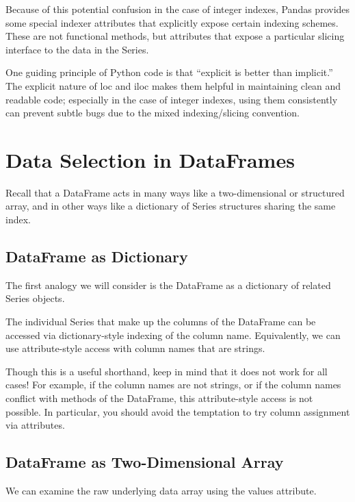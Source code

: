 Because of this potential confusion in the case of integer indexes, Pandas provides
some special indexer attributes that explicitly expose certain indexing schemes. These
are not functional methods, but attributes that expose a particular slicing interface to
the data in the Series.



One guiding principle of Python code is that “explicit is better than implicit.” The
explicit nature of loc and iloc makes them helpful in maintaining clean and readable
code; especially in the case of integer indexes, using them consistently can prevent
subtle bugs due to the mixed indexing/slicing convention.

\section{Data Selection in DataFrames}
Recall that a DataFrame acts in many ways like a two-dimensional or structured array,
and in other ways like a dictionary of Series structures sharing the same index.

\subsection*{DataFrame as Dictionary}
The first analogy we will consider is the DataFrame as a dictionary of related Series
objects.

The individual Series that make up the columns of the DataFrame can be accessed
via dictionary-style indexing of the column name. Equivalently, we can use attribute-style access with column names that are strings.

Though this is a useful shorthand, keep in mind that it does not work for all cases!
For example, if the column names are not strings, or if the column names conflict
with methods of the DataFrame, this attribute-style access is not possible. In particular, you should avoid the temptation to try column assignment via
attributes.

\subsection*{DataFrame as Two-Dimensional Array}
We can examine the raw underlying data array using the values
attribute.

